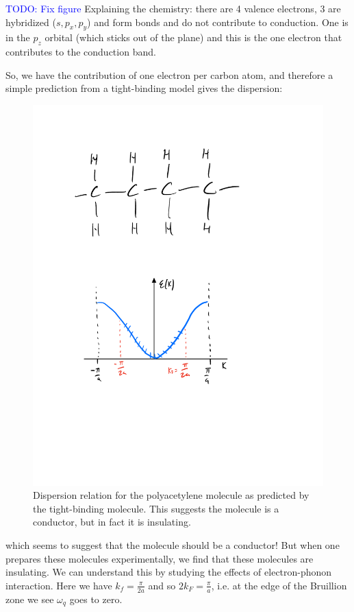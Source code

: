 \textcolor{blue}{TODO: Fix figure}
Explaining the chemistry: there are 4 valence electrons, 3 are hybridized ($s, p_x, p_y$) and form bonds and do not contribute to conduction. One is in the $p_z$ orbital (which sticks out of the plane) and this is the one electron that contributes to the conduction band.

So, we have the contribution of one electron per carbon atom, and therefore a simple prediction from a tight-binding model gives the dispersion:
\begin{figure}[htbp]
    \centering
    \includegraphics[scale=0.6]{Images/fig-polyacetightbinddispersion.pdf}
    \caption{Dispersion relation for the polyacetylene molecule as predicted by the tight-binding molecule. This suggests the molecule is a conductor, but in fact it is insulating.}
    \label{fig-polyacetightbinddispersion}
\end{figure}
which seems to suggest that the molecule should be a conductor! But when one prepares these molecules experimentally, we find that these molecules are insulating. We can understand this by studying the effects of electron-phonon interaction. Here we have $k_f = \frac{\pi}{2a}$ and so $2k_F = \frac{\pi}{a}$, i.e. at the edge of the Bruillion zone we see $\omega_q$ goes to zero.

